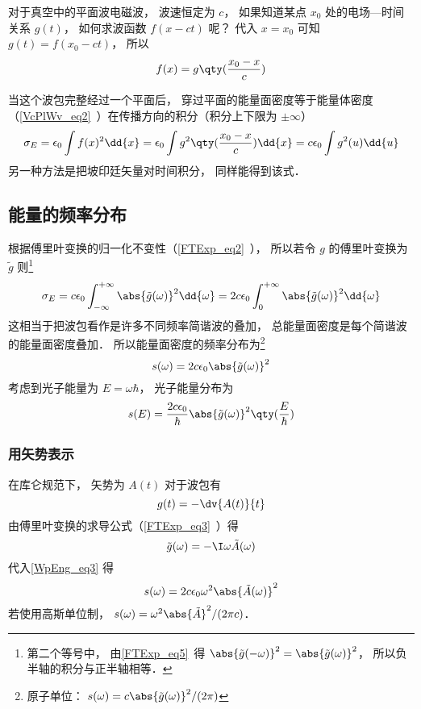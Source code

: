

对于真空中的平面波电磁波， 波速恒定为 $c$， 如果知道某点 $x_0$ 处的电场—时间关系 $g(t)$， 如何求波函数 $f(x - ct)$ 呢？ 代入 $x = x_0$ 可知 $g(t) = f(x_0 - ct)$， 所以
\begin{equation}
f(x) = g\qty(\frac{x_0 - x}{c})
\end{equation}

当这个波包完整经过一个平面后， 穿过平面的能量面密度等于能量体密度（\autoref{VcPlWv_eq2}~）在传播方向的积分（积分上下限为 $\pm\infty$）
\begin{equation}\label{WpEng_eq1}
\sigma_E = \epsilon_0 \int f(x)^2 \dd{x} = \epsilon_0  \int g^2\qty(\frac{x_0 - x}{c}) \dd{x} = c\epsilon_0 \int g^2(u) \dd{u}
\end{equation}
另一种方法是把坡印廷矢量对时间积分， 同样能得到该式．

\subsection{能量的频率分布}
根据傅里叶变换的归一化不变性（\autoref{FTExp_eq2}~）， 所以若令 $g$ 的傅里叶变换为 $\tilde g$ 则\footnote{第二个等号中， 由\autoref{FTExp_eq5}~得 $\abs{\tilde g(-\omega)}^2 = \abs{\tilde g(\omega)}^2$， 所以负半轴的积分与正半轴相等．}
\begin{equation}
\sigma_E = c\epsilon_0 \int_{-\infty}^{+\infty} \abs{\tilde g(\omega)}^2 \dd{\omega} = 2c\epsilon_0 \int_{0}^{+\infty} \abs{\tilde g(\omega)}^2 \dd{\omega}
\end{equation}
这相当于把波包看作是许多不同频率简谐波的叠加， 总能量面密度是每个简谐波的能量面密度叠加． 所以能量面密度的频率分布为\footnote{原子单位： $s(\omega) = c \abs{\tilde g(\omega)}^2/(2\pi)$}
\begin{equation}\label{WpEng_eq3}
s(\omega) = 2c\epsilon_0 \abs{\tilde g(\omega)}^2
\end{equation}
考虑到光子能量为 $E = \omega\hbar$， 光子能量分布为
\begin{equation}\label{WpEng_eq2}
s(E) = \frac{2c\epsilon_0}{\hbar} \abs{\tilde g(\omega)}^2 \qty(\frac{E}{\hbar})
\end{equation}

\subsubsection{用矢势表示}
在库仑规范下， 矢势为 $A(t)$ 对于波包有
\begin{equation}
g(t) = -\dv{A(t)}{t}
\end{equation}
由傅里叶变换的求导公式（\autoref{FTExp_eq3}~）得
\begin{equation}\label{WpEng_eq4}
\tilde g(\omega) = -\I \omega \tilde A(\omega)
\end{equation}
代入\autoref{WpEng_eq3} 得
\begin{equation}\label{WpEng_eq5}
s(\omega) = 2c\epsilon_0 \omega^2 \abs{\tilde A(\omega)}^2
\end{equation}
若使用高斯单位制， $s(\omega) = \omega^2 \abs{\tilde A}^2/(2\pi c)$．
